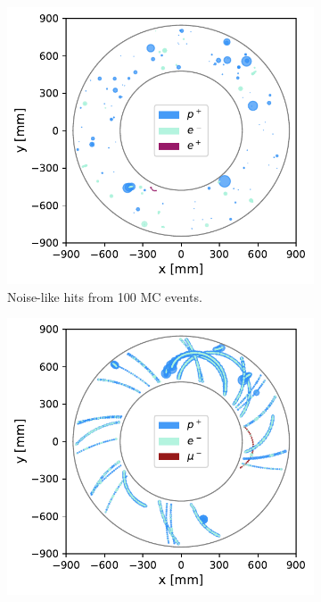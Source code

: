 \begin{figure}
    \centering
    \begin{subfigure}[t]{0.45\textwidth}
        \centering
        \hspace{-1cm} %
        \includegraphics[width=\textwidth]{chapter4/only_noiselike_events.pdf}
        \caption{Noise-like hits from 100 MC events.}
        \label{fig:cdc_rconst_vs_noise:low}
    \end{subfigure}
    \begin{subfigure}[t]{0.45\textwidth}
        \centering
        \hspace{-1cm} %
        \includegraphics[width=\textwidth]{chapter4/only_reconstructible_events.pdf}

\end{subfigure}
\end{figure}
